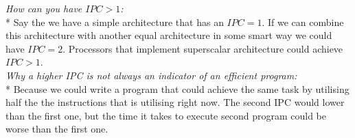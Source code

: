 \documentclass[11pt,letter]{article}
\begin{document}
\noindent\emph{How can you have $IPC > 1$:}\\*
Say the we have a simple architecture that has an $IPC = 1$. If we can combine this architecture with another equal architecture in some smart way we could have $IPC = 2$. Processors that implement superscalar architecture could achieve $IPC > 1$. \\[10pt]

\noindent\emph{Why a higher IPC is not always an indicator of an efficient program:}\\*
Because we could write a program that could achieve the same task by utilising half the the instructions that is utilising right now. The second IPC would lower than the first one, but the time it takes to execute second program could be worse than the first one. 
\end{document}
